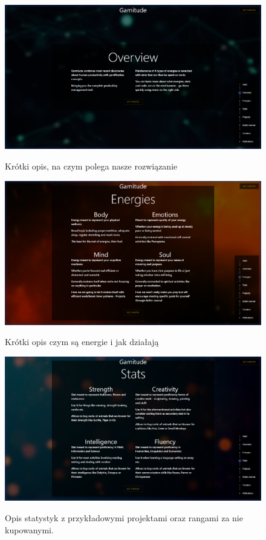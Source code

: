 \documentclass[a4paper,11pt]{report}
\begin{document}
\begin{figure}[H]
	\centering
	\includegraphics[scale=0.3]{prezentacja/Homepage_Overview}\\
	\caption{Krótki opis, na czym polega nasze rozwiązanie}
	\label{fig:homepage_overview}
\end{figure}
\begin{figure}[H]
	\centering
	\includegraphics[scale=0.3]{prezentacja/Homepage_Energies}\\
	\caption{Krótki opis czym są energie i jak działają}
	\label{fig:homepage_energies}
\end{figure}
\begin{figure}[H]
	\centering
	\includegraphics[scale=0.3]{prezentacja/Homepage_Stats}\\
	\caption{Opis statystyk z przykładowymi projektami oraz rangami za nie kupowanymi.}
	\label{fig:homepage_stats}
\end{figure}
\end{document}
